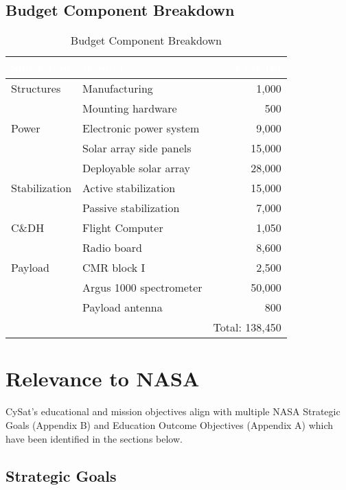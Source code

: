 \documentclass[nocover]            %
{CSLI}                       %
\begin{document}
\subsection{Budget Component Breakdown}
\begin{table}[H]
\centering
\caption{Budget Component Breakdown}
\begin{tabular}{| l | p{5cm} | r |}
\arrayrulecolor{white}
\hline
\rowcolor{gray!80}
\textcolor{white}{\textbf{Subsystem}} & \textcolor{white}{\textbf{Item(s)}} &  \textcolor{white}{\textbf{Cost (\$)}} \\ \hline
\rowcolor{gray!10}
Structures & Manufacturing&1,000 \\
\rowcolor{gray!10}
 &Mounting hardware &500 \\ \hline
\rowcolor{gray!5}
Power & Electronic power system & 9,000\\
\rowcolor{gray!5}
& Solar array side panels &15,000 \\
\rowcolor{gray!5}
& Deployable solar array & 28,000\\ \hline
\rowcolor{gray!10}
Stabilization & Active stabilization&15,000 \\
\rowcolor{gray!10}
&Passive stabilization &7,000 \\ \hline
\rowcolor{gray!5}
C\&DH& Flight Computer &1,050\\
\rowcolor{gray!5}
& Radio board& 8,600\\ \hline
\rowcolor{gray!10}
Payload & CMR block I &2,500 \\
\rowcolor{gray!10}
& Argus 1000 spectrometer &50,000 \\
\rowcolor{gray!10}
& Payload antenna & 800\\\hline
\rowcolor{gray!5}
 &  & Total: 138,450\\ \hline
\end{tabular}
\end{table}

\section{Relevance to NASA}
CySat's educational and mission objectives align with multiple NASA Strategic Goals (Appendix B) and Education Outcome Objectives (Appendix A) which have been identified in the sections below.
\subsection{Strategic Goals}
\end{document}
